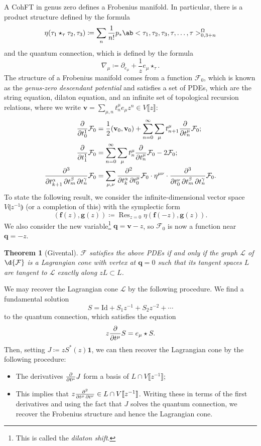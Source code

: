 \documentclass{amsart}
\newtheorem{thm}{Theorem}[section]
\theoremstyle{definition}
\theoremstyle{remark}
\theoremstyle{plain}
\theoremstyle{definition}
\theoremstyle{remark}
\newcommand{\mc}[1]{\mathcal{#1}}
\newcommand{\mbf}[1]{\mathbf{#1}}
\newcommand{\bv}{\mbf{v}}
\newcommand{\bq}{\mbf{q}}
\newcommand{\mr}[1]{\mathrm{#1}}
\newcommand{\on}[1]{\operatorname{#1}}
\newcommand{\1}{\mathbf{1}}
\newcommand{\2}{\mathbf{2}}
\newcommand{\3}{\mathbf{3}}
\newcommand{\ps}[1]{\llbracket #1 \rrbracket}
\newcommand{\ls}[1]{\llparenthesis #1 \rrparenthesis}
\begin{document}
A CohFT in genus zero defines a Frobenius manifold. In particular, there is a product structure defined by the formula
\[ \eta(\tau_1 \star_{\tau} \tau_2, \tau_3) \coloneqq \sum_n \frac{1}{n!} p_* \ab<\tau_1, \tau_2, \tau_3, \tau,\ldots, \tau>_{0,3+n}^{\Omega} \]
and the quantum connection, which is defined by the formula
\[ \nabla_{\mu} \coloneqq \partial_{e_{\mu}} + \frac{1}{z} e_{\mu} \star_{\tau}. \]
The structure of a Frobenius manifold comes from a function $\mc{F}_0$, which is known as the \textit{genus-zero descendant potential} and satisfies a set of PDEs, which are the string equation, dilaton equation, and an infinite set of topological recursion relations, where we write $\bv = \sum_{\mu,n} t^{\mu}_n e_{\mu} z^n \in V\ps{z}$:
\begin{align*}
    \pdv{}{t_0^1} \mc{F}_0 &= \frac{1}{2} (\bv_0, \bv_0) + \sum_{n=0}^{\infty} \sum_{\mu} t_{n+1}^{\mu} \pdv{}{t_n^{\mu}} \mc{F}_0; \\
    \pdv{}{t_1^1} \mc{F}_0 &= \sum_{n=0}^{\infty} \sum_{\mu} t_n^{\mu} \pdv{}{t_n^{\mu}}\mc{F}_0 - 2 \mc{F}_0; \\
    \pdv{}{t_{k+1}^{\alpha},t_m^{\beta},t_n^{\gamma}} \mc{F}_0 &= \sum_{\mu,\nu} \pdv{}{t_k^{\alpha},t_0^{\mu}} \mc{F}_0 \cdot \eta^{\mu\nu} \cdot \pdv{}{t_0^{\nu},t_{m}^{\beta},t_n^{\gamma}} \mc{F}_0.
\end{align*}
To state the following result, we consider the infinite-dimensional vector space $V\ls{z^{-1}}$ (or a completion of this) with the symplectic form
\[ (\mbf{f}(z), \mbf{g}(z)) \coloneqq \on{Res}_{z=0}\eta(\mbf{f}(-z), \mbf{g}(z)). \]
We also consider the new variable\footnote{This is called the \textit{dilaton shift}.} $\bq = \bv - z$, so $\mc{F}_0$ is now a function near $\bq = -z$.

\begin{thm}[Givental]
    $\mc{F}$ satisfies the above PDEs if and only if the graph $\mc{L}$ of $\d{\mc{F}}$ is a Lagrangian cone with vertex at $\bq = 0$ such that its tangent spaces $L$ are tangent to $\mc{L}$ exactly along $zL \subset L$.
\end{thm}

We may recover the Lagrangian cone $\mc{L}$ by the following procedure. We find a fundamental solution 
\[ S = \mr{Id} + S_1 z^{-1} + S_2 z^{-2} + \cdots \]
to the quantum connection, which satisfies the equation
\[ z \pdv{}{t^{\mu}}S = e_{\mu} \star S. \]
Then, setting $J \coloneqq z S^*(z) \1$, we can then recover the Lagrangian cone by the following procedure:
\begin{itemize}
    \item The derivatives $\pdv{}{t^{\mu}} J$ form a basis of $L \cap V\ps{z^{-1}}$;
    \item This implies that $z \pdv{}{t^{\mu},t^{\nu}} \in L \cap V \ps{z^{-1}}$. Writing these in terms of the first derivatives and using the fact that $J$ solves the quantum connection, we recover the Frobenius structure and hence the Lagrangian cone.
\end{itemize}
\end{document}
